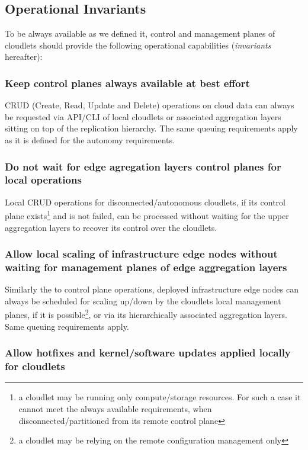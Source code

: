 \documentclass[conference]{IEEEtran}
\begin{document}
\subsection{Operational Invariants}

To be always available as we defined it, control and management planes of
cloudlets should provide the following operational capabilities
(\textit{invariants} hereafter):

\subsubsection{Keep control planes always available at best effort}

CRUD (Create, Read, Update and Delete) operations on cloud data can always be
requested via API/CLI of local cloudlets or associated aggregation layers
sitting on top of the replication hierarchy. The same queuing requirements
apply as it is defined for the autonomy requirements.

\subsubsection{Do not wait for edge agregation layers control planes for local
operations}

Local CRUD operations for disconnected/autonomous cloudlets,
if its control plane exists\footnote{a cloudlet may be running only
compute/storage resources. For such a case it cannot meet the always available
requirements, when disconnected/partitioned from its remote control plane} and
is not failed, can be processed without waiting for the upper aggregation
layers to recover its control over the cloudlets.

\subsubsection{Allow local scaling of infrastructure edge nodes without waiting
for management planes of edge aggregation layers}

Similarly the to control plane operations, deployed infrastructure edge nodes
can always be scheduled for scaling up/down by the cloudlets local management
planes, if it is possible\footnote{a cloudlet may be relying on the remote
configuration management only}, or via its hierarchically associated
aggregation layers. Same queuing requirements apply.

\subsubsection{Allow hotfixes and kernel/software updates applied locally for
cloudlets}
\end{document}
